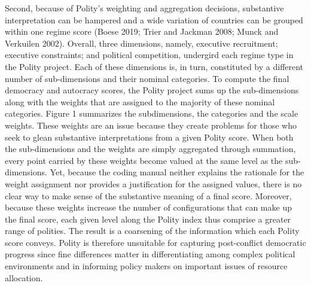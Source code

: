 \documentclass [11pt]{article}
\begin{document}
Second, because of Polity's weighting and aggregation decisions, substantive interpretation can be hampered and a wide variation of countries can be grouped within one regime score (Boese 2019; Trier and Jackman 2008; Munck and Verkuilen 2002). Overall, three dimensions, namely, executive recruitment; executive constraints; and political competition, undergird each regime type in the Polity project. Each of these dimensions is, in turn, constituted by a different number of sub-dimensions and their nominal categories. To compute the final democracy and autocracy scores, the Polity project sums up the sub-dimensions along with the weights that are assigned to the majority of these nominal categories. Figure 1 summarizes the subdimensions, the categories and the scale weights. These weights are an issue because they create problems for those who seek to glean substantive interpretations from a given Polity score. When both the sub-dimensions and the weights are simply aggregated through summation, every point carried by these weights become valued at the same level as the sub-dimensions. Yet, because the coding manual neither explains the rationale for the weight assignment nor provides a justification for the assigned values, there is no clear way to make sense of the substantive meaning of a final score. Moreover, because these weights increase the number of configurations that can make up the final score, each given level along the Polity index thus comprise a greater range of polities. The result is a coarsening of the information which each Polity score conveys. Polity is therefore unsuitable for capturing post-conflict democratic progress since fine differences matter in differentiating among complex political environments and in informing policy makers on important issues of resource allocation.
\end{document}
